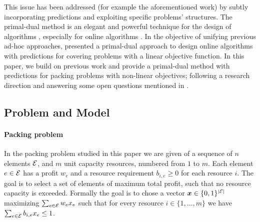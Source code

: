 This issue has been addressed (for example the aforementioned work) 
by subtly incorporating predictions and exploiting specific problems' structures.
The primal-dual method is an elegant and powerful technique for the design of algorithms \cite{WilliamsonShmoys11:The-design-of-approximation}, 
especially for online algorithms \cite{BuchbinderNaor09:Online-primal-dual}.
In the objective of unifying previous ad-hoc approaches,  
\cite{BamasMaggiori20:The-Primal-Dual-method} presented a primal-dual 
approach to design 
online algorithms with predictions for covering problems with a linear objective function. In this paper, we build on  previous work and  
provide a primal-dual method with predictions for packing problems with non-linear objectives;
following a research direction and answering some open questions mentioned  in \cite{BamasMaggiori20:The-Primal-Dual-method}.





 
 
 
\subsection{Problem and Model}  	\label{sec:model}
 
\paragraph{Packing problem} In the packing problem studied in this paper we are given of a sequence of $n$ elements ${\cal E}$, and $m$ unit capacity resources, numbered from $1$ to $m$.  Each element $e\in\cal E$ has a profit $w_e$ and a resource requirement $b_{i,e}\geq 0$ for each resource $i$. The goal is to select a set of elements of maximum total profit, such that no resource capacity is exceeded.  Formally the goal is to chose a vector $\bm{x} \in\{0,1\}^{|\cal E|}$ maximizing $\sum_{e\in\cal E} w_e x_e$ such that for every resource $i\in\{1,\ldots,m\}$ we have $\sum_{e\in\cal E} b_{i,e} x_e \leq 1$.  

